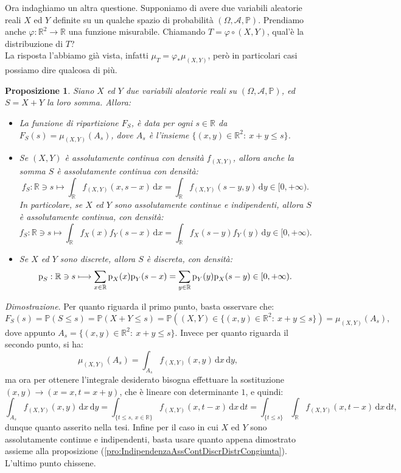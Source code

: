 \documentclass[11pt]{book}
\makeatletter
\theoremstyle{Definizione}
\theoremstyle{TeoremaProposizioneLemmaCorollario}
\newtheorem{mypropo}[myteo]{Proposizione}
\theoremstyle{OsservazioneNota}
\renewenvironment{proof}[1][\proofname]{\par
  \normalfont \topsep6\p@\@plus6\p@\relax
  \trivlist
  \item[\hskip\labelsep
        \itshape
    #1\@addpunct{.}]\ignorespaces
}{%
  \endtrivlist\@endpefalse
}
\newcommand{\R}{\mathbb{R}}
\renewcommand{\P}{\mathbb{P}}
\renewcommand{\d}{\mathrm{d}}
\newcommand{\dx}{\,\d x}
\newcommand{\dy}{\,\d y}
\newcommand{\dt}{\,\d t}
\newcommand{\p}{\textup{p}}
\renewenvironment{proof}{\textsl{Dimostrazione}.}{}
\makeatother
\begin{document}
\noindent
Ora indaghiamo un altra questione. Supponiamo di avere due variabili aleatorie reali $X$ ed $Y$ definite su un qualche spazio di probabilità $(\Omega,\mathcal{A},\P)$. Prendiamo anche $\varphi:\R^2\longrightarrow \R$ una funzione misurabile. Chiamando $T = \varphi \circ (X,Y)$, qual'è la distribuzione di $T$?\\
La risposta l'abbiamo già vista, infatti $\mu_T = \varphi_* \mu_{(X,Y)}$, però in particolari casi possiamo dire qualcosa di più.
\begin{boxpro}
\begin{mypropo}\label{pro:DensitàSommaVAReali}
Siano $X$ ed $Y$ due variabili aleatorie reali su $(\Omega,\mathcal{A},\P)$, ed $S = X+Y$ la loro somma. Allora:
\begin{itemize}
\item[$(i)$] La funzione di ripartizione $F_S$, è data per ogni $s\in \R$ da $F_S(s) = \mu_{(X,Y)}(A_s)$, dove $A_s$ è l'insieme $\{(x,y)\in \R^2:\ x+y\leq s\}$.
\item[$(ii)$] Se $(X,Y)$ è assolutamente continua con densità $f_{(X,Y)}$, allora anche la somma $S$ è assolutamente continua con densità:
$$
f_S:\R \ni s \longmapsto \int_\R f_{(X,Y)}(x,s-x)\dx = \int_\R f_{(X,Y)} (s-y,y)\dy\in [0,+\infty).
$$
In particolare, se $X$ ed $Y$ sono assolutamente continue e indipendenti, allora $S$ è assolutamente continua, con densità:
$$
f_S:\R \ni s \longmapsto \int_\R f_X(x)f_Y(s-x)\dx = \int_\R f_X(s-y)f_Y(y)\dy \in [0,+\infty).
$$
\item[$(iii)$]Se $X$ ed $Y$ sono discrete, allora $S$ è discreta, con densità:
$$
\p_S:\R \ni s \longmapsto \sum_{x\in \R} \p_X(x)\p_Y(s-x) = \sum_{y\in \R} \p_Y(y)\p_X(s-y)\in [0,+\infty).
$$
\end{itemize}
\end{mypropo}
\tcblower
\begin{proof}
Per quanto riguarda il primo punto, basta osservare che:
$$
F_S(s) = \P(S\leq s) = \P(X+Y\leq s) = \P((X,Y)\in \{(x,y)\in \R^2:\ x+y\leq s\}) = \mu_{(X,Y)}(A_s),
$$
dove appunto $A_s= \{(x,y)\in \R^2:\ x+y\leq s\}$. Invece per quanto riguarda il secondo punto, si ha:
$$
\mu_{(X,Y)}(A_s) = \int_{A_s} f_{(X,Y)}(x,y)\dx\dy,
$$
ma ora per ottenere l'integrale desiderato bisogna effettuare la sostituzione $(x,y) \to (x=x,t=x+y)$, che è lineare con determinante $1$, e quindi:
$$
\int_{A_s} f_{(X,Y)}(x,y)\dx\dy = \int_{\{t \leq s,\ x\in \R\}} f_{(X,Y)}(x,t-x)\dx\dt = \int_{\{t\leq s\}}\int_\R f_{(X,Y)}(x,t-x)\dx\dt,
$$
dunque quanto asserito nella tesi. Infine per il caso in cui $X$ ed $Y$ sono assolutamente continue e indipendenti, basta usare quanto appena dimostrato assieme alla proposizione (\ref{pro:IndipendenzaAssContDiscrDistrCongiunta}). L'ultimo punto chissene.
\end{proof}
\end{boxpro}
\end{document}
